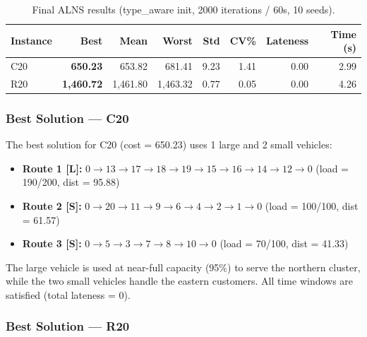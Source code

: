 \documentclass[11pt]{article}
\begin{document}
\begin{table}[htbp]
\centering
\begin{tabular}{@{}lrrrrrrr@{}}
\toprule
\textbf{Instance} & \textbf{Best} & \textbf{Mean} & \textbf{Worst} & \textbf{Std} & \textbf{CV\%} & \textbf{Lateness} & \textbf{Time (s)} \\
\midrule
C20 & \textbf{650.23} & 653.82 & 681.41 & 9.23 & 1.41 & 0.00 & 2.99 \\
R20 & \textbf{1,460.72} & 1,461.80 & 1,463.32 & 0.77 & 0.05 & 0.00 & 4.26 \\
\bottomrule
\end{tabular}
\caption{Final ALNS results (type\_aware init, 2000 iterations / 60s, 10 seeds).}
\label{tab:final}
\end{table}

\subsubsection{Best Solution --- C20}

The best solution for C20 (cost = 650.23) uses 1 large and 2 small vehicles:
\begin{itemize}[leftmargin=*]
    \item \textbf{Route 1 [L]:} $0 \to 13 \to 17 \to 18 \to 19 \to 15 \to 16 \to 14 \to 12 \to 0$ \quad (load = 190/200, dist = 95.88)
    \item \textbf{Route 2 [S]:} $0 \to 20 \to 11 \to 9 \to 6 \to 4 \to 2 \to 1 \to 0$ \quad (load = 100/100, dist = 61.57)
    \item \textbf{Route 3 [S]:} $0 \to 5 \to 3 \to 7 \to 8 \to 10 \to 0$ \quad (load = 70/100, dist = 41.33)
\end{itemize}
The large vehicle is used at near-full capacity (95\%) to serve the northern cluster, while the two small vehicles handle the eastern customers. All time windows are satisfied (total lateness = 0).

\subsubsection{Best Solution --- R20}
\end{document}
